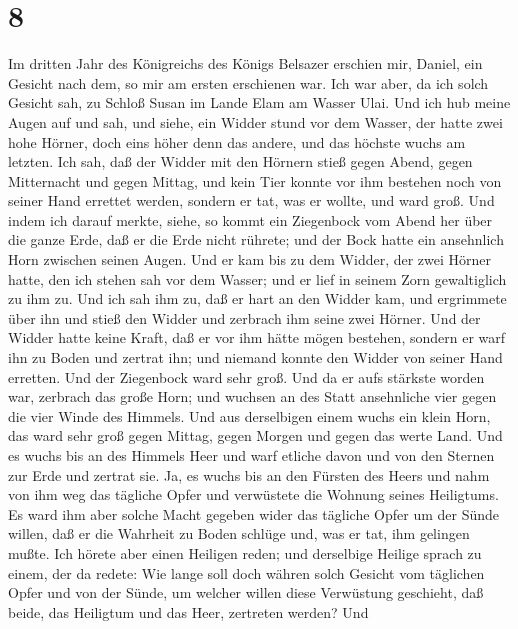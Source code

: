 \hypertarget{section-7}{%
\section{8}\label{section-7}}

 Im dritten Jahr des Königreichs des Königs Belsazer
erschien mir, Daniel, ein Gesicht nach dem, so mir am ersten erschienen
war.  Ich war aber, da ich solch Gesicht sah, zu Schloß
Susan im Lande Elam am Wasser Ulai.  Und ich hub meine Augen
auf und sah, und siehe, ein Widder stund vor dem Wasser, der hatte zwei
hohe Hörner, doch eins höher denn das andere, und das höchste wuchs am
letzten.  Ich sah, daß der Widder mit den Hörnern stieß
gegen Abend, gegen Mitternacht und gegen Mittag, und kein Tier konnte
vor ihm bestehen noch von seiner Hand errettet werden, sondern er tat,
was er wollte, und ward groß.  Und indem ich darauf merkte,
siehe, so kommt ein Ziegenbock vom Abend her über die ganze Erde, daß er
die Erde nicht rührete; und der Bock hatte ein ansehnlich Horn zwischen
seinen Augen.  Und er kam bis zu dem Widder, der zwei Hörner
hatte, den ich stehen sah vor dem Wasser; und er lief in seinem Zorn
gewaltiglich zu ihm zu.  Und ich sah ihm zu, daß er hart an
den Widder kam, und ergrimmete über ihn und stieß den Widder und
zerbrach ihm seine zwei Hörner. Und der Widder hatte keine Kraft, daß er
vor ihm hätte mögen bestehen, sondern er warf ihn zu Boden und zertrat
ihn; und niemand konnte den Widder von seiner Hand erretten.
 Und der Ziegenbock ward sehr groß. Und da er aufs stärkste
worden war, zerbrach das große Horn; und wuchsen an des Statt
ansehnliche vier gegen die vier Winde des Himmels.  Und aus
derselbigen einem wuchs ein klein Horn, das ward sehr groß gegen Mittag,
gegen Morgen und gegen das werte Land.  Und es wuchs bis an
des Himmels Heer und warf etliche davon und von den Sternen zur Erde und
zertrat sie.  Ja, es wuchs bis an den Fürsten des Heers und
nahm von ihm weg das tägliche Opfer und verwüstete die Wohnung seines
Heiligtums.  Es ward ihm aber solche Macht gegeben wider
das tägliche Opfer um der Sünde willen, daß er die Wahrheit zu Boden
schlüge und, was er tat, ihm gelingen mußte.  Ich hörete
aber einen Heiligen reden; und derselbige Heilige sprach zu einem, der
da redete: Wie lange soll doch währen solch Gesicht vom täglichen Opfer
und von der Sünde, um welcher willen diese Verwüstung geschieht, daß
beide, das Heiligtum und das Heer, zertreten werden?  Und
